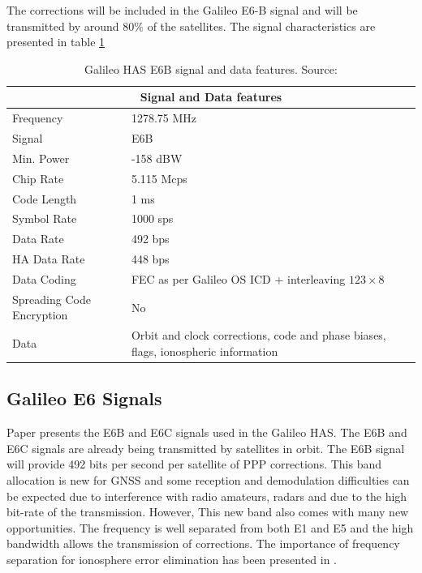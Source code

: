 The corrections will be included in the Galileo E6-B signal and will be transmitted by around $80\%$ of the satellites\cite{galileoHasPolicy}. The signal characteristics are presented in table \ref{table:1}
\begin{table}[h!]
\centering
\begin{tabular}{| m{15em} | m{20em} |}
    \hline
    \multicolumn{2}{|c|}{Signal and Data features} \\
    \hline
    Frequency & 1278.75 MHz \\
    \hline
    Signal & E6B \\
    \hline
    Min. Power & -158 dBW \\
    \hline
    Chip Rate & 5.115 Mcps \\
    \hline
    Code Length & 1 ms \\
    \hline
    Symbol Rate & 1000 sps \\
    \hline
    Data Rate & 492 bps \\ 
    \hline
    HA Data Rate & 448 bps \\
    \hline
    Data Coding & FEC as per Galileo OS ICD + interleaving $123 \times 8$ \\
    \hline
    Spreading Code Encryption & No \\
    \hline
    Data & Orbit and clock corrections, code and phase biases, flags, ionospheric information \\
    \hline
\end{tabular}
\caption{Galileo HAS E6B signal and data features. Source: \cite{galileoSisIcd}}
\label{table:1}
\end{table}

\subsection{Galileo E6 Signals}
\label{subsec:e6signals}

Paper \cite{e6breceiver} presents the E6B and E6C signals used in the Galileo HAS. The E6B and E6C signals are already being transmitted by satellites in orbit. The E6B signal will provide 492 bits per second per satellite of PPP corrections. This band allocation is new for GNSS and some reception and demodulation difficulties can be expected due to interference with radio amateurs, radars and due to the high bit-rate of the transmission\cite{e6breceiver}. However, This new band also comes with many new opportunities. The frequency is well separated from both E1 and E5 and the high bandwidth allows the transmission of corrections. The importance of frequency separation for ionosphere error elimination has been presented in \cite{instantPPP}.

